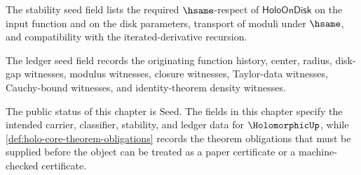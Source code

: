 \begin{definition}
\label{def:holo-stability-cert}
The stability seed field lists the required $\hsame$-respect of $\mathsf{HoloOnDisk}$ on the input function and on the disk parameters, transport of moduli under $\hsame$, and compatibility with the iterated-derivative recursion.
\end{definition}

\begin{definition}
\label{def:holo-ledger-policy}
The ledger seed field records the originating function history, center, radius, disk-gap witnesses, modulus witnesses, closure witnesses, Taylor-data witnesses, Cauchy-bound witnesses, and identity-theorem density witnesses.
\end{definition}

\begin{definition}
\label{def:holo-certificate-seed}
The public status of this chapter is $\text{Seed}$. The fields in this chapter specify the intended carrier, classifier, stability, and ledger data for $\HolomorphicUp$, while \autoref{def:holo-core-theorem-obligations} records the theorem obligations that must be supplied before the object can be treated as a paper certificate or a machine-checked certificate.
\end{definition}


\begin{closurestatus}{\HolomorphicUp}
  \theoryclosure{\seedClosure}
  \formalstatus{\unformalizedV}
\end{closurestatus}
